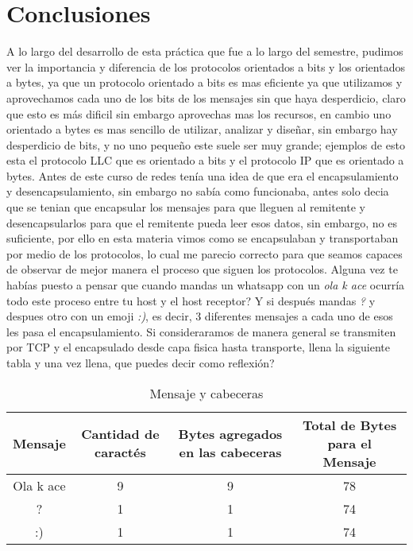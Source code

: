 \section{Conclusiones}
	A lo largo del desarrollo de esta pr\'actica que fue a lo largo del semestre, pudimos ver la importancia y diferencia de los protocolos orientados a bits y los orientados a bytes, ya que un protocolo orientado a bits es mas eficiente ya que utilizamos y aprovechamos cada uno de los bits de los mensajes sin que haya desperdicio, claro que esto es m\'as dificil sin embargo aprovechas mas los recursos, en cambio uno orientado a bytes es mas sencillo de utilizar, analizar y dise\~nar, sin embargo hay desperdicio de bits, y no uno peque\~no este suele ser muy grande; ejemplos de esto esta el protocolo LLC que es orientado a bits y el protocolo IP que es orientado a bytes.
\vskip 1pt
	Antes de este curso de redes ten\'ia una idea de que era el encapsulamiento y desencapsulamiento, sin embargo no sab\'ia como funcionaba, antes solo decia que se tenian que encapsular los mensajes para que lleguen al remitente y desencapsularlos para que el remitente pueda leer esos datos, sin embargo, no es suficiente, por ello en esta materia vimos como se encapsulaban y transportaban por medio de los protocolos, lo cual me parecio correcto para que seamos capaces de observar de mejor manera el proceso que siguen los protocolos.
\vskip 1pt
	Alguna vez te hab\'ias puesto a pensar que cuando mandas un whatsapp con un \textit{ola k ace} ocurr\'ia todo este proceso entre tu host y el host receptor? Y si despu\'es mandas \textit{?} y despues otro con un emoji \textit{:)}, es decir,  3 diferentes mensajes a cada uno de esos les pasa el encapsulamiento. Si consideraramos de manera general se transmiten por TCP y el encapsulado desde capa fisica hasta transporte, llena la siguiente tabla  y una vez llena, que puedes decir como reflexi\'on?
\vskip 1pt
\begin{table}[h]
	\begin{center}
	\begin{tabular}{| c | c | c | c |}
			Mensaje & Cantidad de caract\'es & Bytes agregados en las cabeceras & Total de Bytes para el Mensaje \\ \hline
			Ola k ace & 9 & 9 & 78 \\
			? & 1 & 1  & 74 \\
			:) & 1 & 1 & 74 \\ \hline
	\end{tabular}
	\caption{Mensaje y cabeceras}
	\label{tab:mensaje}
	\end{center}
\end{table}
